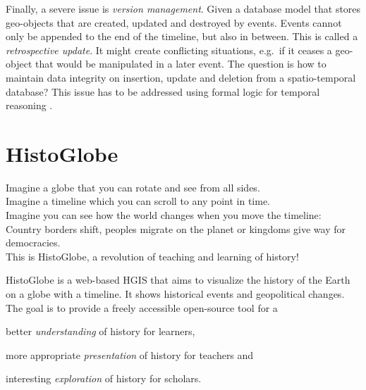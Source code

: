 Finally, a severe issue is \emph{version management}. Given a database model that stores geo-objects that are created, updated and destroyed by events. Events cannot only be appended to the end of the timeline, but also in between. This is called a \emph{retrospective update}. It might create conflicting situations, e.g.\ if it ceases a geo-object that would be manipulated in a later event. The question is how to maintain data integrity on insertion, update and deletion from a spatio-temporal database? This issue has to be addressed using formal logic for temporal reasoning
\cite[section 6]{peuquet99}.




\section{HistoGlobe} %
\label{sec:histoglobe}

\begin{quoteit}
  Imagine a globe that you can rotate and see from all sides. \\
  Imagine a timeline which you can scroll to any point in time. \\
  Imagine you can see how the world changes when you move the timeline: \\
  Country borders shift, peoples migrate on the planet or kingdoms give way for democracies. \\[0.5em]
  This is HistoGlobe, a revolution of teaching and learning of history!
\end{quoteit}

HistoGlobe is a web-based HGIS that aims to visualize the history of the Earth on a globe with a timeline. It shows historical events and geopolitical changes. The goal is to provide a freely accessible open-source tool for a

\begin{compactitem}
  \item better \emph{understanding} of history for learners,
  \item more appropriate \emph{presentation} of history for teachers and
  \item interesting \emph{exploration} of history for scholars.
\end{compactitem}

